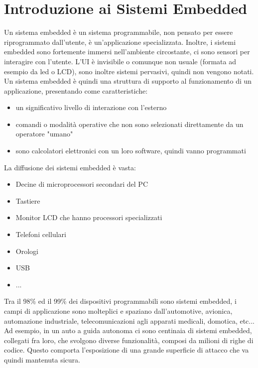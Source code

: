 \documentclass{article}
\begin{document}
\Large
\tableofcontents
\section{Introduzione ai Sistemi Embedded}
Un sistema embedded è un sistema programmabile, non pensato per essere riprogrammato dall'utente, è un'applicazione specializzata. Inoltre, i sistemi embedded sono fortemente immersi nell'ambiente circostante, ci sono sensori per interagire con l'utente. L'UI è invisibile o comunque non usuale (formata ad esempio da led o LCD), sono inoltre sistemi pervasivi, quindi non vengono notati.\\ Un sistema embedded è quindi una struttura di supporto al funzionamento di un applicazione, presentando come caratteristiche:
\begin{itemize}
\item un significativo livello di interazione con l'esterno
\item comandi o modalità operative che non sono selezionati direttamente da un operatore "umano"
\item sono calcolatori elettronici con un loro software, quindi vanno programmati
\end{itemize}
La diffusione dei sistemi embedded è vasta:
\begin{itemize}
\item Decine di microprocessori secondari del PC
\item Tastiere
\item Monitor LCD che hanno processori specializzati
\item Telefoni cellulari
\item Orologi
\item USB
\item ...
\end{itemize}
Tra il 98\% ed il 99\% dei dispositivi programmabili sono sistemi embedded, i campi di applicazione sono molteplici e spaziano dall'automotive, avionica, automazione industriale, telecomunicazioni agli apparati medicali, domotica, etc...\\ Ad esempio, in un auto a guida autonoma ci sono centinaia di sistemi embedded, collegati fra loro, che svolgono diverse funzionalità, composi da milioni di righe di codice. Questo comporta l'esposizione di una grande superficie di attacco che va quindi mantenuta sicura.
\end{document}
